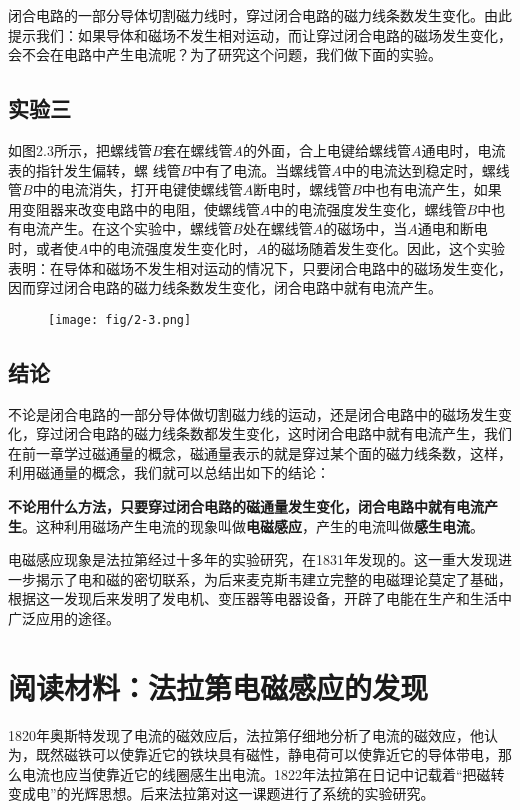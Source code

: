 闭合电路的一部分导体切割磁力线时，穿过闭合电路的磁力线条数发生变化。由此提示我们：如果导体和磁场不发生相对运动，而让穿过闭合电路的磁场发生变化，会不会在电路中产生电流呢？为了研究这个问题，我们做下面的实验。

\subsection*{实验三}

如图2.3所示，把螺线管$B$套在螺线管$A$的外面，合上电键给螺线管$A$通电时，电流表的指针发生偏转，螺
线管$B$中有了电流。当螺线管$A$中的电流达到稳定时，螺线管$B$中的电流消失，打开电键使螺线管$A$断电时，螺线管$B$中也有电流产生，如果用变阻器来改变电路中的电阻，使螺线管$A$中的电流强度发生变化，螺线管$B$中也有电流产生。在这个实验中，螺线管$B$处在螺线管$A$的磁场中，当$A$通电和断电时，或者使$A$中的电流强度发生变化时，$A$的磁场随着发生变化。因此，这个实验表明：在导体和磁场不发生相对运动的情况下，只要闭合电路中的磁场发生变化，因而穿过闭合电路的磁力线条数发生变化，闭合电路中就有电流产生。
\begin{figure}[htp]\centering
\texttt{[image: fig/2-3.png]}
\caption{}
\end{figure}

\subsection*{结论}


不论是闭合电路的一部分导体做切割磁力线的运动，还是闭合电路中的磁场发生变化，穿过闭合电路的磁力线条数都发生变化，这时闭合电路中就有电流产生，我们在前一章学过磁通量的概念，磁通量表示的就是穿过某个面的磁力线条数，这样，利用磁通量的概念，我们就可以总结出如下的结论：

\textbf{不论用什么方法，只要穿过闭合电路的磁通量发生变化，闭合电路中就有电流产生}。这种利用磁场产生电流的现象叫做\textbf{电磁感应}，产生的电流叫做\textbf{感生电流}。

电磁感应现象是法拉第经过十多年的实验研究，在1831年发现的。这一重大发现进一步揭示了电和磁的密切联系，为后来麦克斯韦建立完整的电磁理论莫定了基础，根据这一发现后来发明了发电机、变压器等电器设备，开辟了电能在生产和生活中广泛应用的途径。

\section*{阅读材料：法拉第电磁感应的发现}

1820年奥斯特发现了电流的磁效应后，法拉第仔细地分析了电流的磁效应，他认为，既然磁铁可以使靠近它的铁块具有磁性，静电荷可以使靠近它的导体带电，那么电流也应当使靠近它的线圈感生出电流。1822年法拉第在日记中记载着“把磁转变成电”的光辉思想。后来法拉第对这一课题进行了系统的实验研究。

